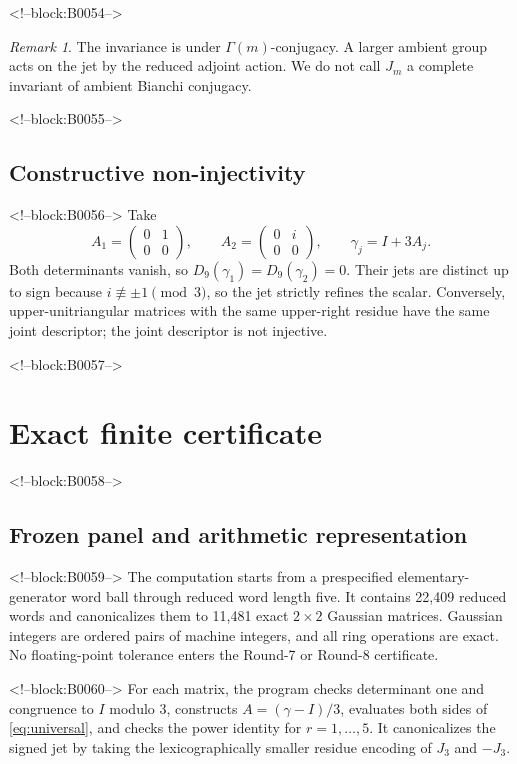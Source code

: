 \documentclass[11pt,a4paper]{article}
\theoremstyle{definition}
\theoremstyle{remark}
\newtheorem{remark}[theorem]{Remark}
\begin{document}
<!--block:B0054-->
\begin{remark}
The invariance is under \(\Gamma(m)\)-conjugacy. A larger ambient group acts on the jet by the reduced adjoint action. We do not call \(J_m\) a complete invariant of ambient Bianchi conjugacy.
\end{remark}

<!--block:B0055-->
\subsection{Constructive non-injectivity}

<!--block:B0056-->
Take
\[
 A_1=\begin{pmatrix}0&1\\0&0\end{pmatrix},\qquad
 A_2=\begin{pmatrix}0&i\\0&0\end{pmatrix},\qquad
 \gamma_j=I+3A_j.
\]
Both determinants vanish, so \(D_9(\gamma_1)=D_9(\gamma_2)=0\). Their jets are distinct up to sign because \(i\not\equiv\pm1\pmod3\), so the jet strictly refines the scalar. Conversely, upper-unitriangular matrices with the same upper-right residue have the same joint descriptor; the joint descriptor is not injective.

<!--block:B0057-->
\section{Exact finite certificate}

<!--block:B0058-->
\subsection{Frozen panel and arithmetic representation}

<!--block:B0059-->
The computation starts from a prespecified elementary-generator word ball through reduced word length five. It contains 22,409 reduced words and canonicalizes them to 11,481 exact \(2\times2\) Gaussian matrices. Gaussian integers are ordered pairs of machine integers, and all ring operations are exact. No floating-point tolerance enters the Round-7 or Round-8 certificate.

<!--block:B0060-->
For each matrix, the program checks determinant one and congruence to \(I\) modulo \(3\), constructs \(A=(\gamma-I)/3\), evaluates both sides of \cref{eq:universal}, and checks the power identity for \(r=1,\ldots,5\). It canonicalizes the signed jet by taking the lexicographically smaller residue encoding of \(J_3\) and \(-J_3\).
\end{document}

